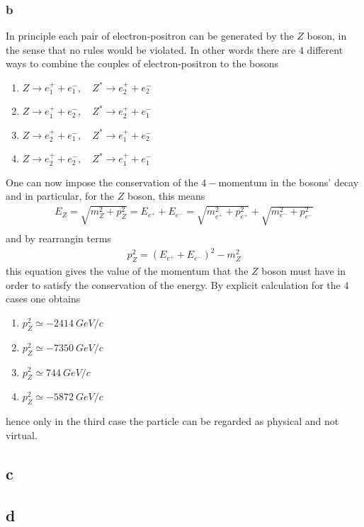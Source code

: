 \subsubsection*{b}
In principle each pair of electron-positron can be generated by the $Z$ boson, in the sense that no rules would be violated. 
In other words there are $4$ different ways to combine the couples of electron-positron to the bosons
\begin{enumerate}
    \item $Z \rightarrow e^+_1 + e^-_1, \quad Z^* \rightarrow e^+_2 + e^-_2$
    \item $Z \rightarrow e^+_1 + e^-_2, \quad Z^* \rightarrow e^+_2 + e^-_1$ 
    \item $Z \rightarrow e^+_2 + e^-_1, \quad Z^* \rightarrow e^+_1 + e^-_2$
    \item $Z \rightarrow e^+_2 + e^-_2, \quad Z^* \rightarrow e^+_1 + e^-_1$
\end{enumerate}
One can now impose the conservation of the $4-$momentum in the bosons' decay and in particular, for the $Z$ boson, this means 
\begin{gather*}
    E_Z = \sqrt{m_Z^2 + p_Z^2} = E_{e^+} + E_{e^-} = \sqrt{m_{e^+}^2 + p_{e^+}^2} + \sqrt{m_{e^-}^2 + p_{e^-}^2} \\
\end{gather*}
and by rearrangin terms
\begin{gather*}
    p_Z^2 = (E_{e^+} + E_{e^-})^2 - m_Z^2
\end{gather*}
this equation gives the value of the momentum that the $Z$ boson must have in order to satisfy the conservation of the energy.
By explicit calculation for the $4$ cases one obtains 
\begin{enumerate}
    \item $p_Z^2 \simeq -2414~GeV/c$
    \item $p_Z^2 \simeq -7350~GeV/c$
    \item $p_Z^2 \simeq 744~GeV/c$
    \item $p_Z^2 \simeq  -5872~GeV/c$
\end{enumerate}
hence only in the third case the particle can be regarded as physical and not virtual.

\subsection*{c}
\subsection*{d}